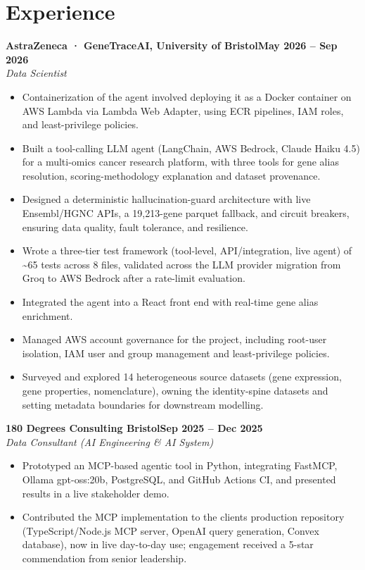 \documentclass[a4paper,11pt]{article}
\newcommand{\entry}[4]{\needspace{4\baselineskip}\noindent\textbf{#1}\hfill\textbf{#2}\\ \textit{#3}\hfill\textit{#4}\par}
\begin{document}
\section{Experience}
\entry{AstraZeneca · GeneTraceAI, University of Bristol}{May 2026 – Sep 2026}{Data Scientist}{}
\begin{itemize}
  \item Containerization of the agent involved deploying it as a Docker container on AWS Lambda via Lambda Web Adapter, using ECR pipelines, IAM roles, and least-privilege policies.
  \item Built a tool-calling LLM agent (LangChain, AWS Bedrock, Claude Haiku 4.5) for a multi-omics cancer research platform, with three tools for gene alias resolution, scoring-methodology explanation and dataset provenance.
  \item Designed a deterministic hallucination-guard architecture with live Ensembl/HGNC APIs, a 19,213-gene parquet fallback, and circuit breakers, ensuring data quality, fault tolerance, and resilience.
  \item Wrote a three-tier test framework (tool-level, API/integration, live agent) of \textasciitilde{}65 tests across 8 files, validated across the LLM provider migration from Groq to AWS Bedrock after a rate-limit evaluation.
  \item Integrated the agent into a React front end with real-time gene alias enrichment.
  \item Managed AWS account governance for the project, including root-user isolation, IAM user and group management and least-privilege policies.
  \item Surveyed and explored 14 heterogeneous source datasets (gene expression, gene properties, nomenclature), owning the identity-spine datasets and setting metadata boundaries for downstream modelling.
\end{itemize}
\vspace{4pt}
\entry{180 Degrees Consulting Bristol}{Sep 2025 – Dec 2025}{Data Consultant (AI Engineering \& AI System)}{}
\begin{itemize}
  \item Prototyped an MCP-based agentic tool in Python, integrating FastMCP, Ollama gpt-oss:20b, PostgreSQL, and GitHub Actions CI, and presented results in a live stakeholder demo.
  \item Contributed the MCP implementation to the client\textquotesingle{}s production repository (TypeScript/Node.js MCP server, OpenAI query generation, Convex database), now in live day-to-day use; engagement received a 5-star commendation from senior leadership.
\end{itemize}
\end{document}
